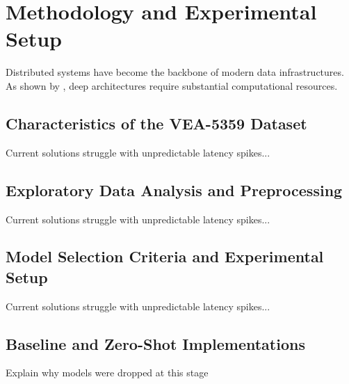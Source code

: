 \chapter{Methodology and Experimental Setup}
\label{chap:methodology}

Distributed systems have become the backbone of modern data infrastructures. As shown by \textcite{vaswani2017attention}, deep architectures require substantial computational resources.


\section{Characteristics of the VEA-5359 Dataset}
\label{sec:datasetStructure}

Current solutions struggle with unpredictable latency spikes...


\section{Exploratory Data Analysis and Preprocessing}
\label{sec:dataExploration}

Current solutions struggle with unpredictable latency spikes...


\section{Model Selection Criteria and Experimental Setup}
\label{sec:modelSelectionSetup}

Current solutions struggle with unpredictable latency spikes...


\section{Baseline and Zero-Shot Implementations}
\label{sec:baselineZSImplementation}

Explain why models were dropped at this stage

